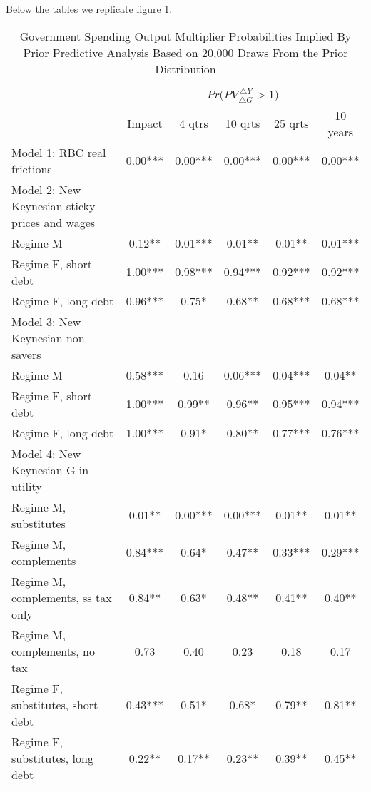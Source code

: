 \documentclass[letterpaper,12pt]{article}%
\begin{document}
Below the tables we replicate figure 1.


\begin{table}[H]
    \centering
    \begin{threeparttable}
    \caption{Government Spending Output Multiplier Probabilities Implied By Prior Predictive Analysis Based on 20,000 Draws From the Prior Distribution}
    \begin{tabular}{l c c c c c}
    \toprule
        & \multicolumn{5}{c}{$Pr\Big(PV \frac{\triangle Y}{\triangle G}>1\Big)$}\\
      \cmidrule{2-6}
        & Impact & 4 qtrs & 10 qrts & 25 qrts & 10 years \\
       \midrule
     Model 1: RBC real frictions & 0.00***   & 0.00***  & 0.00***  & 0.00***  & 0.00*** \\
     Model 2: New Keynesian sticky prices and wages  &    &   &   &   &       \\
     \quad Regime M & 0.12** & 0.01*** & 0.01** & 0.01** & 0.01***  \\
     \quad Regime F, short debt & 1.00*** &  0.98***  & 0.94*** & 0.92***  & 0.92***  \\
     \quad Regime F, long debt &  0.96*** & 0.75* & 0.68** &  0.68***  & 0.68***  \\
     Model 3: New Keynesian non-savers &    &   &   &   &  \\
     \quad Regime M &   0.58*** & 0.16 & 0.06***  & 0.04*** & 0.04** \\
     \quad Regime F, short debt &  1.00*** &  0.99**  & 0.96** & 0.95***  & 0.94*** \\
     \quad Regime F, long debt &   1.00*** & 0.91* & 0.80** & 0.77***  & 0.76*** \\
     Model 4: New Keynesian G in utility &    &   &   &   &  \\
     \quad Regime M, substitutes &   0.01** & 0.00*** & 0.00***  & 0.01**  & 0.01**  \\
     \quad Regime M, complements &   0.84*** &  0.64* &  0.47**  & 0.33***  & 0.29***  \\
     \quad Regime M, complements, ss tax only &   0.84** & 0.63*  & 0.48** & 0.41** & 0.40**  \\
     \quad Regime M, complements, no tax &   0.73 &  0.40 & 0.23  & 0.18 & 0.17 \\
     \quad Regime F, substitutes, short debt &  0.43*** & 0.51*  & 0.68*  & 0.79** & 0.81**  \\
     \quad Regime F, substitutes, long debt &  0.22**  & 0.17**  & 0.23** &  0.39**  & 0.45** \\

\end{tabular}
\end{threeparttable}
\end{table}
\end{document}
